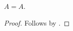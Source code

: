

\begin{proposition}\label{phase7_composition_diamond_left}
    $A=A$.
\end{proposition}
\begin{proof}
    Follows by \auto.
\end{proof}

